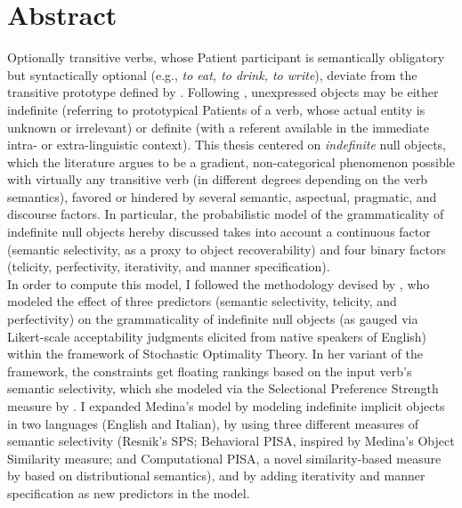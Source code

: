 \chapter*{Abstract}

Optionally transitive verbs, whose Patient participant is semantically obligatory but syntactically optional (e.g., \textit{to eat, to drink, to write}), deviate from the transitive prototype defined by \textcite{HopperThompson1980}. Following \textcite{Fillmore1986}, unexpressed objects may be either indefinite (referring to prototypical Patients of a verb, whose actual entity is unknown or irrelevant) or definite (with a referent available in the immediate intra- or extra-linguistic context). This thesis centered on \textit{indefinite} null objects, which the literature argues to be a gradient, non-categorical phenomenon possible with virtually any transitive verb (in different degrees depending on the verb semantics), favored or hindered by several semantic, aspectual, pragmatic, and discourse factors. In particular, the probabilistic model of the grammaticality of indefinite null objects hereby discussed takes into account a continuous factor (semantic selectivity, as a proxy to object recoverability) and four binary factors (telicity, perfectivity, iterativity, and manner specification).\\
In order to compute this model, I followed the methodology devised by \textcite{Medina2007}, who modeled the effect of three predictors (semantic selectivity, telicity, and perfectivity) on the grammaticality of indefinite null objects (as gauged via Likert-scale acceptability judgments elicited from native speakers of English) within the framework of Stochastic Optimality Theory. In her variant of the framework, the constraints get floating rankings based on the input verb's semantic selectivity, which she modeled via the Selectional Preference Strength measure by \textcite{Resnik1993, Resnik1996}. I expanded Medina's model by modeling indefinite implicit objects in two languages (English and Italian), by using three different measures of semantic selectivity (Resnik's SPS; Behavioral PISA, inspired by Medina's Object Similarity measure; and Computational PISA, a novel similarity-based measure by \textcite{CappelliLenciPISA} based on distributional semantics), and by adding iterativity and manner specification as new predictors in the model.\\ %
